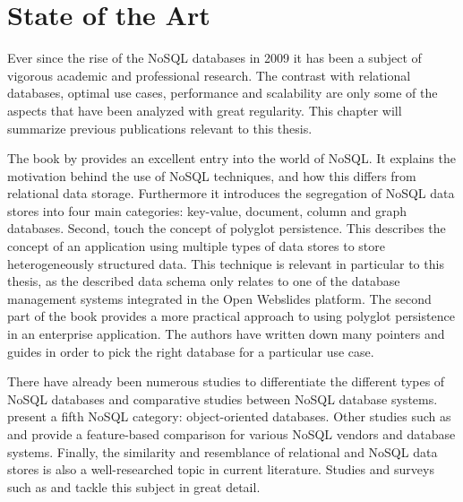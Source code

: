\chapter{State of the Art}
\label{ch:state-of-the-art}

Ever since the rise of the NoSQL databases in 2009 \autocite{Sadalage2012} it has been a subject of vigorous academic and professional research.
The contrast with relational databases, optimal use cases, performance and scalability are only some of the aspects that have been analyzed with great regularity.
This chapter will summarize previous publications relevant to this thesis.


The book by \textcite{Sadalage2012} provides an excellent entry into the world of NoSQL.
It explains the motivation behind the use of NoSQL techniques, and how this differs from relational data storage.
Furthermore it introduces the segregation of NoSQL data stores into four main categories: key-value, document, column and graph databases.
Second, \citeauthor{Sadalage2012} touch the concept of polyglot persistence.
This describes the concept of an application using multiple types of data stores to store heterogeneously structured data.
This technique is relevant in particular to this thesis, as the described data schema only relates to one of the database management systems integrated in the Open Webslides platform.
The second part of the book provides a more practical approach to using polyglot persistence in an enterprise application.
The authors have written down many pointers and guides in order to pick the right database for a particular use case.

There have already been numerous studies to differentiate the different types of NoSQL databases and comparative studies between NoSQL database systems.
\textcite{Nayak2013} present a fifth NoSQL category: object-oriented databases.
Other studies such as \textcite{Moniruzzaman2013} and \textcite{Maroo2013} provide a feature-based comparison for various NoSQL vendors and database systems.
Finally, the similarity and resemblance of relational and NoSQL data stores is also a well-researched topic in current literature.
Studies and surveys such as \textcite{Mohamed2014} and \textcite{Cattell2010} tackle this subject in great detail.

